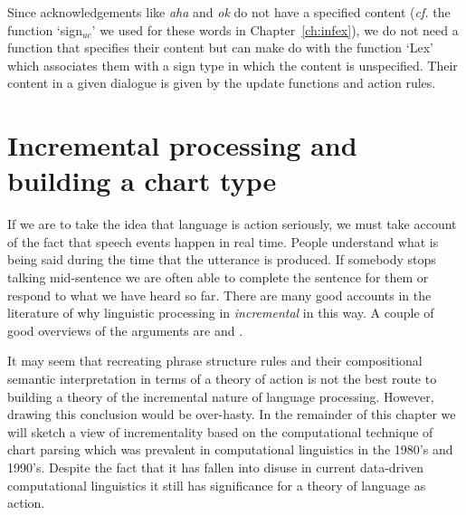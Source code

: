 
Since acknowledgements like \textit{aha} and
\textit{ok} do not have a specified content (\textit{cf.} the function
`sign$_{\mathit{uc}}$' we used for these words in
Chapter~\ref{ch:infex}), we do not need a function that specifies
their content but can make do with the function `Lex' which associates
them with a sign type in which the content is unspecified.  Their
content in a given dialogue is given by the update functions and
action rules.

\section{Incremental processing and building a chart type}
\label{sec:chart}


If we are to take the idea that language is action seriously, we must
take account of the fact that speech events happen in real time.
People understand what is being said during the time that the
utterance is produced.  If somebody stops talking mid-sentence we are
often able to complete the sentence for them or respond to what we
have heard so far.  There are many good accounts in the literature of
why linguistic processing in \textit{incremental} in this way.  A
couple of good overviews of the arguments are
\cite{GinzburgPoesio2016} and
\cite{KempsonCannGregoromichelakiChatzikyriakidis2016}.

It may seem that recreating phrase structure rules and their
compositional semantic interpretation in terms of a theory of action
is not the best route to building a theory of the incremental nature
of language processing.  However, drawing this conclusion would be
over-hasty.  In the remainder of this chapter we will sketch a view of
incrementality based on the computational technique of chart parsing
which was prevalent in computational linguistics in the 1980's and
1990's.  Despite the fact that it has fallen into disuse in current
data-driven computational linguistics it still has significance for a
theory of language as action.

